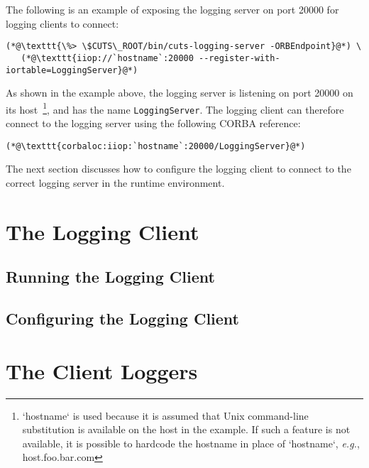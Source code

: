 The following is an example of exposing the logging server on
port 20000 for logging clients to connect:
\begin{lstlisting}
(*@\texttt{\%> \$CUTS\_ROOT/bin/cuts-logging-server -ORBEndpoint}@*) \
   (*@\texttt{iiop://`hostname`:20000 --register-with-iortable=LoggingServer}@*)
\end{lstlisting}
As shown in the example above, the logging server is listening on 
port 20000 on its host~\footnote{`hostname` is used because it is assumed
that Unix command-line substitution is available on the host in the 
example. If such a feature is not available, it is possible to hardcode 
the hostname in place of `hostname`, \textit{e.g.}, host.foo.bar.com}, 
and has the name \texttt{LoggingServer}. The logging client can 
therefore connect to the logging server using the following CORBA 
reference: 
\begin{lstlisting}
(*@\texttt{corbaloc:iiop:`hostname`:20000/LoggingServer}@*)
\end{lstlisting}
The next section discusses how to configure the logging client to 
connect to the correct logging server in the runtime environment.

\section{The Logging Client}
\label{sec:logging-client}

\subsection{Running the Logging Client}

\subsection{Configuring the Logging Client}

\section{The Client Loggers}
\label{sec:client-loggers}
